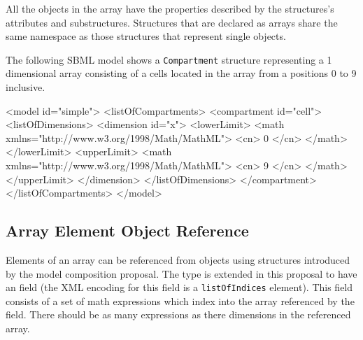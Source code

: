 \documentclass{cekarticle}
\begin{document}
All the objects in the
array have the properties described by the structures's
attributes and substructures.
Structures that are declared as arrays share the same namespace
as those structures that represent single objects.

The following SBML model shows a \texttt{Compartment}
structure representing a 1 dimensional array consisting of
a cells located in the array from a positions 0 to 9 inclusive.

\begin{example}
<model id="simple">
    <listOfCompartments>
        <compartment id="cell">
            <listOfDimensions>
                <dimension id="x">
                    <lowerLimit>
                        <math xmlns="http://www.w3.org/1998/Math/MathML">
                            <cn> 0 </cn>
                        </math>
                    </lowerLimit>
                    <upperLimit>
                        <math xmlns="http://www.w3.org/1998/Math/MathML">
                            <cn> 9 </cn>
                        </math>
                    </upperLimit>
                </dimension>
            </listOfDimensions>
        </compartment>
    </listOfCompartments>
</model>
\end{example}

\subsection{Array Element Object Reference}

Elements of an array can be referenced from objects using  structures introduced by the model composition proposal.
The  type is extended in this proposal to have an  field (the XML encoding for this field is a \texttt{listOfIndices} element).
This field consists of a set of math expressions which index into the array referenced by the  field.  There should be
as many expressions as there dimensions in the referenced array.
\end{document}
